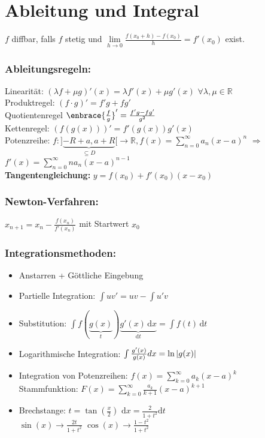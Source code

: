 \documentclass[german]{latex4ei/latex4ei_sheet}
\begin{document}
\section{Ableitung und Integral}
\begin{sectionbox}
 
    $f$ diffbar, falls $f$ stetig und $\underset{h\rightarrow 0}{\lim}\frac{f(x_0+h)-f(x_0)}{h}=f'(x_0)$ exist.
    \subsubsection{Ableitungsregeln:}
    Linearität: $(\lambda f + \mu g)' (x) = \lambda f'(x) + \mu g'(x)$ \quad $\forall \lambda, \mu \in \mathbb R$ \\
    Produktregel: $(f \cdot g)' = f' g + f g'$\\
    Quotientenregel $\enbrace{\frac{f}{g}}' = \frac{f'g - fg'}{g^2}$\\
    Kettenregel: $\left( f(g(x)) \right)' = f'(g(x)) g'(x)$\\
    Potenzreihe: $f: ] \underbrace{-R+a, a+R}_{\subseteq D}	 [ \rightarrow \mathbb R, f(x) = \sum_{n=0}^{\infty} a_n (x -a)^n$ \quad $\Rightarrow$ \quad $f'(x) = \sum_{n=0}^{\infty} n a_{n} (x-a)^{n-1}$\\
    \textbf{Tangentengleichung:} $y=f(x_0)+f'(x_0)(x-x_0)$
    
    \subsubsection{Newton-Verfahren:}
    $x_{n+1}=x_n-\frac{f(x_n)}{f'(x_n)}$ mit Startwert $x_0$
    
    \subsubsection{Integrationsmethoden:}
    \begin{itemize}\itemsep0pt
    \item Anstarren + Göttliche Eingebung
    \item Partielle Integration: $\int uv'=uv-\int u'v$
    \item Substitution: $\int f(\underbrace {g(x)}_{t}) \underbrace {g'(x)\,\mathrm dx}_{\mathrm dt}=\int f(t)\, \mathrm dt$
    \item Logarithmische Integration: $\int \frac{g'(x)}{g(x)}dx=\ln\left\vert g(x)\right\vert$
    \item Integration von Potenzreihen: $f(x)=\sum_{k=0}^{\infty}a_k(x-a)^k$ \\
    Stammfunktion: $F(x)=\sum_{k=0}^{\infty}\frac{a_k}{k+1}(x-a)^{k+1}$
    \item Brechstange: $t=\tan(\frac{x}{2})$ \quad $\mathrm dx = \frac{2}{1+t^2} \mathrm dt$ \\ $\sin(x) \rightarrow \frac{2t}{1+t^2}$ \qquad $\cos(x) \rightarrow \frac{1-t^2}{1+t^2}$
    \end{itemize}
    

\end{sectionbox}
\end{document}
